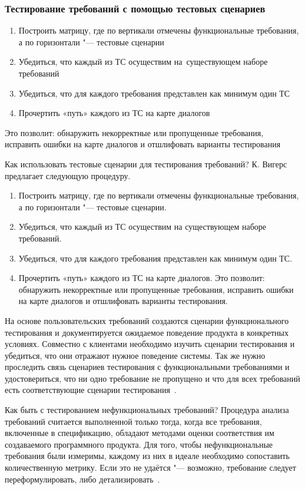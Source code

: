 \documentclass{../industrial-development}
\begin{document}
{\begin{frame} \frametitle {Тестирование требований с помощью тестовых сценариев}
\begin{enumerate}
\item Построить матрицу, где по вертикали отмечены функциональные требования, а по горизонтали "--- тестовые сценарии
\item Убедиться, что каждый из ТС осуществим на~существующем наборе требований
\item Убедиться, что для каждого требования представлен как минимум один ТС
\item Прочертить «путь» каждого из ТС на карте диалогов
\end{enumerate}
Это позволит: обнаружить некорректные или пропущенные требования, исправить ошибки на карте диалогов и отшлифовать варианты тестирования

\end{frame}

\lecturenotes

Как использовать тестовые сценарии для тестирования требований? К. Вигерс предлагает следующую процедуру.

\begin{enumerate}
\item Построить матрицу, где по вертикали отмечены функциональные требования, а по горизонтали "--- тестовые сценарии.
\item Убедиться, что каждый из ТС осуществим на существующем наборе требований.
\item Убедиться, что для каждого требования представлен как минимум один ТС.
\item Прочертить «путь» каждого из ТС на карте диалогов. Это позволит: обнаружить некорректные или пропущенные требования, исправить ошибки на карте диалогов и отшлифовать варианты тестирования.
\end{enumerate}

На основе пользовательских требований создаются сценарии функционального тестирования и документируется ожидаемое поведение продукта в конкретных условиях. Совместно с клиентами необходимо изучить сценарии тестирования и убедиться, что они отражают нужное поведение системы. Так же нужно проследить связь сценариев тестирования с функциональными требованиями и удостовериться, что ни одно требование не пропущено и что для всех требований есть соответствующие сценарии тестирования~\cite[с.~52]{Wiegers}. 

Как быть с тестированием нефункциональных требований? Процедура анализа требований считается выполненной только тогда, когда все
требования, включенные в спецификацию, обладают методами оценки соответствия им создаваемого программного продукта.
Для того, чтобы нефункциональные требования были измеримы, каждому из них в идеале необходимо сопоставить количественную метрику. Если это не удаётся "--- возможно, требование следует переформулировать, либо детализировать~\cite[с.~68]{Maglinec}.



}
\end{document}
